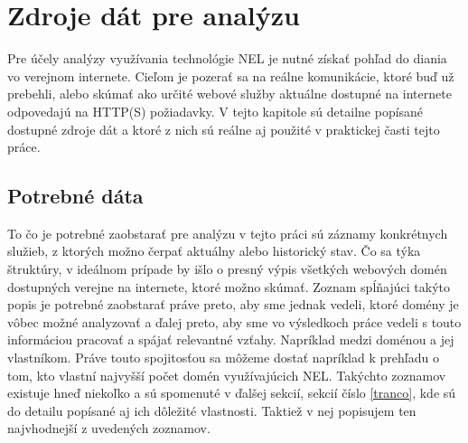 \chapter{Zdroje dát pre analýzu}
\label{data-sources-available-for-research}

Pre účely analýzy využívania technológie NEL je nutné získať pohľad do diania vo verejnom internete.
Cieľom je pozerať sa na reálne komunikácie, ktoré buď už prebehli, alebo skúmať ako určité webové služby aktuálne dostupné na internete
odpovedajú na HTTP(S) požiadavky. V tejto kapitole sú detailne popísané dostupné zdroje dát 
a ktoré z nich sú reálne aj použité v praktickej časti tejto práce. %

\section{Potrebné dáta}

To čo je potrebné zaobstarať pre analýzu v tejto práci sú záznamy konkrétnych služieb, z ktorých možno čerpať aktuálny alebo historický stav. Čo sa týka štruktúry, v ideálnom prípade by išlo o presný výpis všetkých webových domén dostupných verejne na internete, ktoré možno skúmať. 
Zoznam spĺňajúci takýto popis je potrebné zaobstarať práve preto, aby sme jednak vedeli, ktoré domény je vôbec možné analyzovať a ďalej preto, aby sme vo výsledkoch práce vedeli s touto informáciou pracovať a spájať relevantné vzťahy. Napríklad medzi doménou a jej vlastníkom. 
Práve touto spojitosťou sa môžeme dostať napríklad k prehľadu o tom, kto vlastní najvyšší počet domén využívajúcich NEL. 
Takýchto zoznamov existuje hneď niekoľko a sú spomenuté v ďalšej sekcií, sekcií číslo \ref{tranco}, kde sú do detailu popísané aj ich dôležité vlastnosti. 
Taktiež v nej popisujem ten najvhodnejší z uvedených zoznamov.

